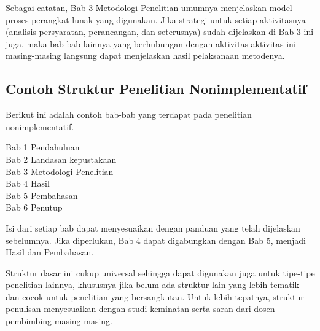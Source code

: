 Sebagai catatan, Bab 3 Metodologi Penelitian umumnya menjelaskan model proses perangkat lunak yang digunakan. Jika strategi untuk setiap aktivitasnya (analisis persyaratan, perancangan, dan seterusnya) sudah dijelaskan di Bab 3 ini juga, maka bab-bab lainnya yang berhubungan dengan aktivitas-aktivitas ini masing-masing langsung dapat menjelaskan hasil pelaksanaan metodenya. 

\subsection{Contoh Struktur Penelitian Nonimplementatif}

Berikut ini adalah contoh bab-bab yang terdapat pada penelitian nonimplementatif. 

\begin{displayquote}
  Bab 1 Pendahuluan \\
  Bab 2 Landasan kepustakaan \\
  Bab 3 Metodologi Penelitian \\
  Bab 4 Hasil \\
  Bab 5 Pembahasan \\
  Bab 6 Penutup
\end{displayquote}

Isi dari setiap bab dapat menyesuaikan dengan panduan yang telah dijelaskan sebelumnya. Jika diperlukan, Bab 4 dapat digabungkan dengan Bab 5, menjadi Hasil dan Pembahasan. 

Struktur dasar ini cukup universal sehingga dapat digunakan juga untuk tipe-tipe penelitian lainnya, khususnya jika belum ada struktur lain yang lebih tematik dan cocok untuk penelitian yang bersangkutan. Untuk lebih tepatnya, struktur penulisan menyesuaikan dengan studi keminatan serta saran dari dosen pembimbing masing-masing.
